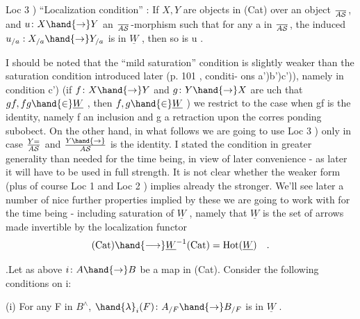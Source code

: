 
Loc 3 ) ``Localization condition'' : If $X,Y$ are objects in (Cat) over
an object $\over{A}{\mathcal{S}}$, and $u\colon X\hand{\to}Y$ an $\over{A}{\mathcal{S}}$-morphism such that for any a in
$\over{A}{\mathcal{S}}$, the induced $u_{/a} : X_{/a}\hand{\to}Y_{/a}$ is in $\underline{W}$ , then so is u .

I should be noted that the ``mild saturation'' condition is slightly
weaker than the saturation condition introduced later (p. 101 , conditi-%
ons a')b')c')), namely in condition c') (if $f\colon X\hand{\to}Y$ and $g\colon Y\hand{\to}X$ are
uch that $gf,fg \hand{\in} \underline{W}$ , then $f,g \hand{\in} \underline{W}$ ) we restrict to the case when gf is
the identity, namely  f an inclusion and g a retraction upon the corres%
ponding subobect. On the other hand, in what follows we are going to
use Loc 3 ) only in case $Y=\over{A}{\mathcal{S}}$ and  $Y\hand{\to}\over{A}{\mathcal{S}}$ is the identity. I stated
the condition in greater generality than needed for the time being,
in view of later convenience - as later it will have to be used in full
strength. It is not clear whether the weaker form  (plus of course Loc 1
and Loc 2 ) implies already the stronger. We'll see later a number of
nice further properties  implied by these we are going to work with for
the time being - including \hand{\uline{\textcolor{black}{strong}}} saturation of $\underline{W}$ , namely that $\underline{W}$ is
the set of arrows made invertible by the localization functor
\[ (\mathrm{Cat}) \hand{\longrightarrow} \underline{W}^{-1}(\mathrm{Cat}) = \mathrm{Hot}(\underline{W}) \quad . \]

\hand{\uline{\textcolor{black}{Proposition}}}.Let as above $i\colon A\hand{\to}B$ be a map in (Cat). Consider the
following conditions on i:

(i) For any F in $B^{\wedge}$, $\hand{\lambda}_i(F)\colon A_{/F} \hand{\to} B_{/F}$ is in $\underline{W}$ .

